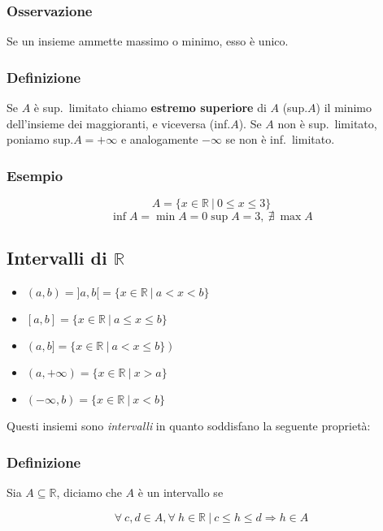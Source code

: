     \subsubsection*{Osservazione}
    Se un insieme ammette massimo o minimo, esso è unico.
    \subsubsection*{Definizione}
    Se $A$ è sup.\ limitato chiamo \textbf{estremo superiore} di $A$ (sup.$A$) il minimo dell'insieme
    dei maggioranti, e viceversa (inf.$A$).
    Se $A$ non è sup.\ limitato, poniamo sup.$A = + \infty$ e analogamente $-\infty$ se non è inf.\ limitato.
    \subsubsection*{Esempio}
    \begin{Large}
        \[
            A = \{x \in \mathbb{R}\ |\ 0 \leq x \leq 3\}
        \]
        \[
            \inf{A} = \min{A} = 0
            \sup{A} = 3,\ \nexists\ \max{A}     
        \]
    \end{Large}
\subsection{Intervalli di $\mathbb{R}$}
\begin{Large}
\begin{itemize}
    \item $(a,b) = ]a,b[= \{x \in \mathbb{R}\ |\ a < x < b\}$
    \item $[a,b]=\{x \in \mathbb{R}\ |\ a \leq x \leq b\}$
    \item $(a,b] = \{x \in \mathbb{R}\ |\ a < x \leq b\})$
    \item $(a,+\infty) = \{x \in \mathbb{R}\ |\ x > a\}$
    \item $(-\infty,b) = \{x \in \mathbb{R}\ |\ x < b \}$
\end{itemize}
\end{Large}
Questi insiemi sono \textit{intervalli} in quanto soddisfano la seguente proprietà:
\subsubsection*{Definizione}
Sia $A\subseteq\mathbb{R}$, diciamo che $A$ è un intervallo se\\
\begin{Large}
    \[
    \forall\ c,d \in A, \forall\ h \in \mathbb{R}\ |\ c \leq h \leq d \Rightarrow h \in A
    \]
\end{Large}

